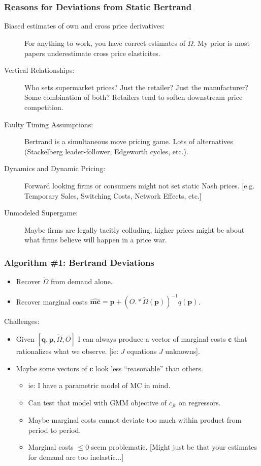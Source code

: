 \documentclass[xcolor=pdftex,dvipsnames,table,mathserif]{beamer}
\begin{document}
\begin{frame}
\frametitle{Reasons for Deviations from Static Bertrand}
\small
\begin{description}
\item[Biased estimates of own and cross price derivatives:] For anything to work, you have correct estimates of $\tilde{\Omega}$. My prior is most papers \alert{underestimate} cross price elasticites.
\item[Vertical Relationships:] Who sets supermarket prices? Just the retailer? Just the manufacturer? Some combination of both? Retailers tend to \alert{soften} downstream price competition.
\item[Faulty Timing Assumptions:] Bertrand is a simultaneous move pricing game. Lots of alternatives (Stackelberg leader-follower, Edgeworth cycles, etc.).
\item[Dynamics and Dynamic Pricing:] Forward looking firms or consumers might not set static Nash prices. [e.g. Temporary Sales, Switching Costs, Network Effects, etc.]
\item[Unmodeled Supergame:] Maybe firms are legally tacitly colluding, higher prices might be about what firms believe will happen in a price war.
\end{description}
\end{frame}
\begin{frame}

\frametitle{Algorithm \#1: Bertrand Deviations}

\begin{itemize}
\item Recover $\tilde{\Omega}$ from demand alone.
\item Recover marginal costs $\widehat{\mathbf{mc}} = \mathbf{p} +(O.*\tilde{\Omega}(\mathbf{p}))^{-1} q(\mathbf{p})$.
\end{itemize}
Challenges:
\begin{itemize}
\item Given $[\mathbf{q},\mathbf{p},\tilde{\Omega},O]$ I can always produce a vector of marginal costs $\mathbf{c}$ that rationalizes what we observe. [ie: $J$ equations $J$ unknowns].
\item Maybe some vectors of $\mathbf{c}$ look less ``reasonable'' than others.
\begin{itemize}
\item ie: I have a parametric model of MC in mind. 
\item Can test that model with GMM objective of $c_{jt}$ on regressors.
\item Maybe marginal costs cannot deviate too much within product from period to period.
\item Marginal costs $\leq 0$ seem problematic. [Might just be that your estimates for demand are too inelastic...]
\end{itemize}
\end{itemize}
\end{frame}
\end{document}
